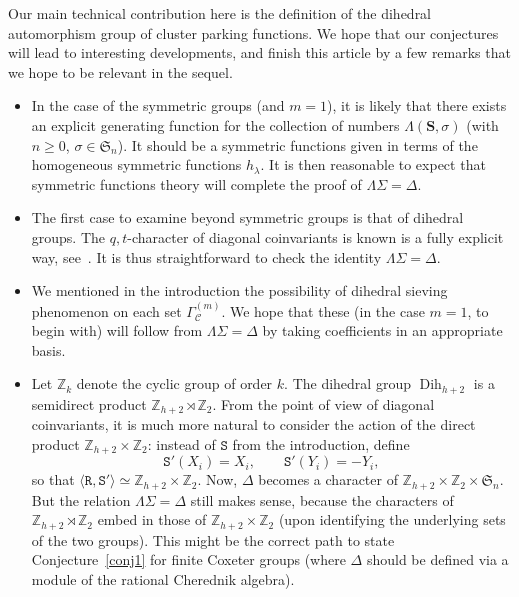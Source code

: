\documentclass[11pt]{article}
\theoremstyle{definition}
\DeclareMathOperator{\dih}{Dih}
\newcommand{\SSS}{\mathbf{S}}
\newcommand{\RRRR}{\mathtt{R}}
\newcommand{\SSSS}{\mathtt{S}}
\begin{document}
Our main technical contribution here is the definition of the dihedral automorphism group of cluster parking functions.  We hope that our conjectures will lead to interesting developments, and finish this article by a few remarks that we hope to be relevant in the sequel.
\begin{itemize}
    \item In the case of the symmetric groups (and $m=1$), it is likely that there exists an explicit generating function for the collection of numbers $\Lambda(\SSS,\sigma)$ (with $n\geq 0$, $\sigma\in\mathfrak{S}_n$).  It should be a symmetric functions given in terms of the homogeneous symmetric functions $h_\lambda$.  It is then reasonable to expect that symmetric functions theory will complete the proof of $\Lambda\Sigma = \Delta$.
    \item The first case to examine beyond symmetric groups is that of dihedral groups.  The $q,t$-character of diagonal coinvariants is known is a fully explicit way, see~\cite{boijgeramita}.  It is thus straightforward to check the identity $\Lambda\Sigma = \Delta$.
    \item We mentioned in the introduction the possibility of dihedral sieving phenomenon on each set $\Gamma^{(m)}_{\mathcal{C}}$.  We hope that these (in the case $m=1$, to begin with) will follow from $\Lambda\Sigma = \Delta$ by taking coefficients in an appropriate basis. 
    \item Let $\mathbb{Z}_k$ denote the cyclic group of order $k$.  The dihedral group $\dih_{h+2}$ is a semidirect product $\mathbb{Z}_{h+2} \rtimes \mathbb{Z}_2$. From the point of view of diagonal coinvariants, it is much more natural to consider the action of the direct product $\mathbb{Z}_{h+2} \times \mathbb{Z}_2$: instead of $\SSSS$ from the introduction, define 
    \[
        \SSSS'(X_i) = X_i, \qquad 
        \SSSS'(Y_i) = -Y_i,
    \]
    so that $\langle \RRRR,\SSSS' \rangle \simeq\mathbb{Z}_{h+2} \times \mathbb{Z}_2$.  Now, $\Delta$ becomes a character of $\mathbb{Z}_{h+2} \times \mathbb{Z}_2 \times \mathfrak{S}_n$.  But the relation $\Lambda \Sigma = \Delta$ still makes sense, because the characters of $\mathbb{Z}_{h+2} \rtimes \mathbb{Z}_2$ embed in those of $\mathbb{Z}_{h+2} \times \mathbb{Z}_2$ (upon identifying the underlying sets of the two groups).  This might be the correct path to state Conjecture~\ref{conj1} for finite Coxeter groups (where $\Delta$ should be defined via a module of the rational Cherednik algebra).
\end{itemize}
\end{document}
